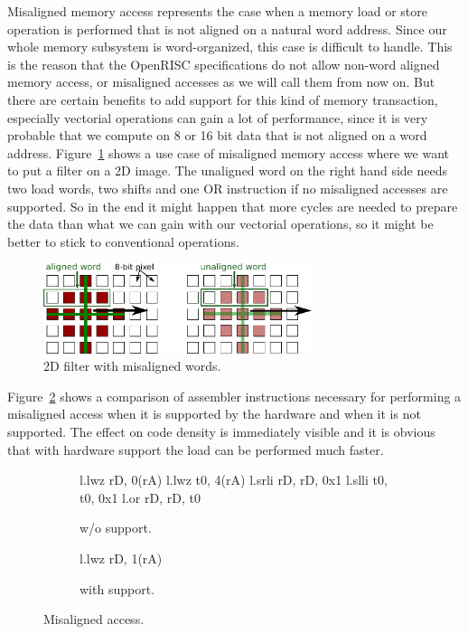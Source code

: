 Misaligned memory access represents the case when a memory load or store
operation is performed that is not aligned on a natural word address. Since our
whole memory subsystem is word-organized, this case is difficult to handle. This
is the reason that the OpenRISC specifications do not allow non-word aligned
memory access, or misaligned accesses as we will call them from now on. But
there are certain benefits to add support for this kind of memory transaction,
especially vectorial operations can gain a lot of performance, since it is very
probable that we compute on 8 or 16 bit data that is not aligned on a word
address. Figure~\ref{fig:unaligned_mem_access_5x5} shows a use case of
misaligned memory access where we want to put a filter on a 2D image. The
unaligned word on the right hand side needs two load words, two shifts and one
OR instruction if no misaligned accesses are supported. So in the end it might
happen that more cycles are needed to prepare the data than what we can gain
with our vectorial operations, so it might be better to stick to conventional
operations.

\begin{figure}[htbp]
  \centering
  \includegraphics[width=0.7\textwidth]{./figures/unaligned_mem_access_5x5}
  \caption{2D filter with misaligned words.}
  \label{fig:unaligned_mem_access_5x5}
\end{figure}

Figure~\ref{fig:misaligned_access} shows a comparison of assembler instructions
necessary for performing a misaligned access when it is supported by the
hardware and when it is not supported. The effect on code density is immediately
visible and it is obvious that with hardware support the load can be performed
much faster.

\begin{figure}[H]
 \begin{subfigure}[b]{0.45\linewidth}
\begin{instrenv}
l.lwz  rD, 0(rA)
l.lwz  t0, 4(rA)
l.srli rD, rD, 0x1
l.slli t0, t0, 0x1
l.or   rD, rD, t0
\end{instrenv}
  \caption{w/o support.}
 \end{subfigure}\hfill
 \begin{subfigure}[b]{0.45\linewidth}
\begin{instrenv}
l.lwz rD, 1(rA)
\end{instrenv}
  \caption{with support.}
 \end{subfigure}

 \caption{Misaligned access.}
 \label{fig:misaligned_access}
\end{figure}

